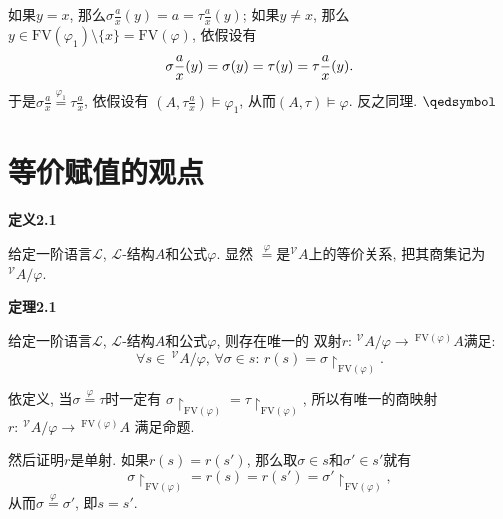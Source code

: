 \documentclass[UTF8]{ctexart}
\begin{document}
\begin{enumerate}
    \vspace{3pt}\hspace{2.17em}
    如果$y=x$, 那么$\displaystyle\sigma\frac{a}{x}(y)=a=\tau\frac{a}{x}(y)$;
    如果$y\neq x$, 那么$y\in\mathrm{FV}(\varphi_1)\setminus\{x\}
    =\mathrm{FV}(\varphi)$, 依假设有
    \vspace{3pt}
    \[
        \sigma\frac{a}{x}(y)=\sigma(y)=\tau(y)=\tau\frac{a}{x}(y).\\[3pt]
    \]
    于是$\displaystyle\sigma\frac{a}{x}\overset{\displaystyle\varphi_1}{=}
    \tau\frac{a}{x}$, 依假设有
    $\displaystyle\left(A,\tau\frac{a}{x}\right)\models\varphi_1$,
    从而$(A,\tau)\models\varphi$. 反之同理. \hfill $\qedsymbol$
\end{enumerate}





\newpage

\section{等价赋值的观点}

\hypertarget{sec:定义2.1}{}
\noindent\textbf{定义2.1}

给定一阶语言$\mathcal{L}$, $\mathcal{L}$-结构$A$和公式$\varphi$. 显然
$\overset{\displaystyle\varphi}{=}$是$^{\mathcal{V}}\!A$上的等价关系,
把其商集记为$^{\mathcal{V}}\!A/\varphi$.

\vspace{10pt}

\hypertarget{sec:定理2.1}{}
\noindent\textbf{定理2.1}

给定一阶语言$\mathcal{L}$, $\mathcal{L}$-结构$A$和公式$\varphi$, 则存在唯一的
双射$r:\,^{\mathcal{V}}\!A/\varphi\to\,^{\mathrm{FV}(\varphi)}A$满足:
\[
    \forall s\in\,\!^{\mathcal{V}}\!A/\varphi,\,\forall\sigma\in s:\,
    r(s)=\sigma\!\restriction_{\mathrm{FV}(\varphi)}.
\]


依定义, 当$\sigma\overset{\displaystyle\varphi}{=}\tau$时一定有
$\sigma\!\restriction_{\mathrm{FV}(\varphi)}=\tau\!\restriction_{\mathrm{FV}(\varphi)}$,
所以有唯一的商映射$r:\,^{\mathcal{V}}\!A/\varphi\to\,^{\mathrm{FV}(\varphi)}A$
满足命题.

然后证明$r$是单射. 如果$r(s)=r(s')$, 那么取$\sigma\in s$和$\sigma'\in s'$就有
\[
    \sigma\!\restriction_{\mathrm{FV}(\varphi)}=r(s)=r(s')=\sigma'\!\restriction_{\mathrm{FV}(\varphi)},
\]
从而$\sigma\overset{\displaystyle\varphi}{=}\sigma'$, 即$s=s'$.
\end{document}
